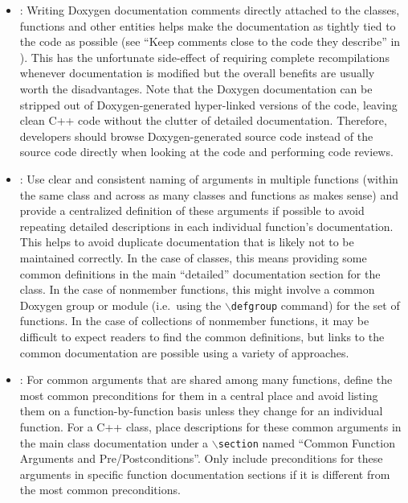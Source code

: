 \begin{itemize}


{}\item\DOXWriteInHeaders: Writing Doxygen documentation comments directly
attached to the classes, functions and other entities helps make the
documentation as tightly tied to the code as possible (see ``Keep comments
close to the code they describe'' in {}\cite[Section
32.5]{CodeComplete2nd04}).  This has the unfortunate side-effect of requiring
complete recompilations whenever documentation is modified but the overall
benefits are usually worth the disadvantages.  Note that the Doxygen
documentation can be stripped out of Doxygen-generated hyper-linked versions
of the code, leaving clean C++ code without the clutter of detailed
documentation.  Therefore, developers should browse Doxygen-generated source
code instead of the source code directly when looking at the code and
performing code reviews.


{}\item\DOXUseCentralizedDefintions: Use clear and consistent naming of
arguments in multiple functions (within the same class and across as many
classes and functions as makes sense) and provide a centralized definition of
these arguments if possible to avoid repeating detailed descriptions in each
individual function's documentation.  This helps to avoid duplicate
documentation that is likely not to be maintained correctly.  In the case of
classes, this means providing some common definitions in the main ``detailed''
documentation section for the class.  In the case of nonmember functions, this
might involve a common Doxygen group or module (i.e.\ using the
{}\texttt{$\backslash$defgroup} command) for the set of functions.  In the
case of collections of nonmember functions, it may be difficult to expect
readers to find the common definitions, but links to the common documentation
are possible using a variety of approaches.


{}\item\DOXUseCentralizedPrePostConditions: For common arguments that are
shared among many functions, define the most common preconditions for them in
a central place and avoid listing them on a function-by-function basis unless
they change for an individual function.  For a C++ class, place descriptions
for these common arguments in the main class documentation under a
{}\texttt{$\backslash$section} named ``Common Function Arguments and
Pre/Postconditions''.  Only include preconditions for these arguments in
specific function documentation sections if it is different from the most
common preconditions.



\end{itemize}
